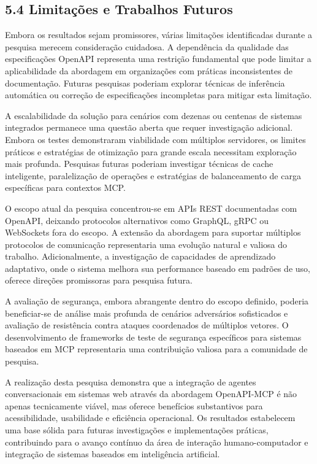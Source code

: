 \documentclass[
]{article}
\begin{document}
\subsection{5.4 Limitações e Trabalhos
Futuros}\label{limitauxe7uxf5es-e-trabalhos-futuros}

Embora os resultados sejam promissores, várias limitações identificadas
durante a pesquisa merecem consideração cuidadosa. A dependência da
qualidade das especificações OpenAPI representa uma restrição
fundamental que pode limitar a aplicabilidade da abordagem em
organizações com práticas inconsistentes de documentação. Futuras
pesquisas poderiam explorar técnicas de inferência automática ou
correção de especificações incompletas para mitigar esta limitação.

A escalabilidade da solução para cenários com dezenas ou centenas de
sistemas integrados permanece uma questão aberta que requer investigação
adicional. Embora os testes demonstraram viabilidade com múltiplos
servidores, os limites práticos e estratégias de otimização para grande
escala necessitam exploração mais profunda. Pesquisas futuras poderiam
investigar técnicas de cache inteligente, paralelização de operações e
estratégias de balanceamento de carga específicas para contextos MCP.

O escopo atual da pesquisa concentrou-se em APIs REST documentadas com
OpenAPI, deixando protocolos alternativos como GraphQL, gRPC ou
WebSockets fora do escopo. A extensão da abordagem para suportar
múltiplos protocolos de comunicação representaria uma evolução natural e
valiosa do trabalho. Adicionalmente, a investigação de capacidades de
aprendizado adaptativo, onde o sistema melhora sua performance baseado
em padrões de uso, oferece direções promissoras para pesquisa futura.

A avaliação de segurança, embora abrangente dentro do escopo definido,
poderia beneficiar-se de análise mais profunda de cenários adversários
sofisticados e avaliação de resistência contra ataques coordenados de
múltiplos vetores. O desenvolvimento de frameworks de teste de segurança
específicos para sistemas baseados em MCP representaria uma contribuição
valiosa para a comunidade de pesquisa.

A realização desta pesquisa demonstra que a integração de agentes
conversacionais em sistemas web através da abordagem OpenAPI-MCP é não
apenas tecnicamente viável, mas oferece benefícios substantivos para
acessibilidade, usabilidade e eficiência operacional. Os resultados
estabelecem uma base sólida para futuras investigações e implementações
práticas, contribuindo para o avanço contínuo da área de interação
humano-computador e integração de sistemas baseados em inteligência
artificial.
\end{document}
